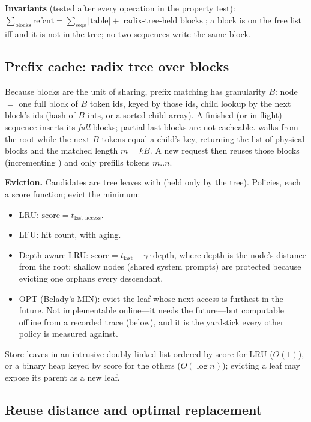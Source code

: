 \textbf{Invariants} (tested after every operation in the property test): $\sum_{\text{blocks}}\text{refcnt} = \sum_{\text{seqs}} |\text{table}| + |\text{radix-tree-held blocks}|$; a block is on the free list iff  and it is not in the tree; no two sequences write the same block.

\subsection{Prefix cache: radix tree over blocks}

Because blocks are the unit of sharing, prefix matching has granularity $B$: node $=$ one full block of $B$ token ids, keyed by those ids, child lookup by the next block's ids (hash of $B$ ints, or a sorted child array). A finished (or in-flight) sequence inserts its \emph{full} blocks; partial last blocks are not cacheable.  walks from the root while the next $B$ tokens equal a child's key, returning the list of physical blocks and the matched length $m = kB$. A new request then reuses those blocks (incrementing ) and only prefills tokens $m..n$.

\textbf{Eviction.} Candidates are tree leaves with  (held only by the tree). Policies, each a score function; evict the minimum:
\begin{itemize}
  \item LRU: $\text{score} = t_{\text{last access}}$.
  \item LFU: hit count, with aging.
  \item Depth-aware LRU: $\text{score} = t_{\text{last}} - \gamma\cdot\text{depth}$, where depth is the node's distance from the root; shallow nodes (shared system prompts) are protected because evicting one orphans every descendant.
  \item OPT (Belady's MIN): evict the leaf whose next access is furthest in the future. Not implementable online---it needs the future---but computable offline from a recorded trace (below), and it is the yardstick every other policy is measured against.
\end{itemize}
Store leaves in an intrusive doubly linked list ordered by score for LRU ($O(1)$), or a binary heap keyed by score for the others ($O(\log n)$); evicting a leaf may expose its parent as a new leaf.

\subsection{Reuse distance and optimal replacement}
\label{sec:reuse}

